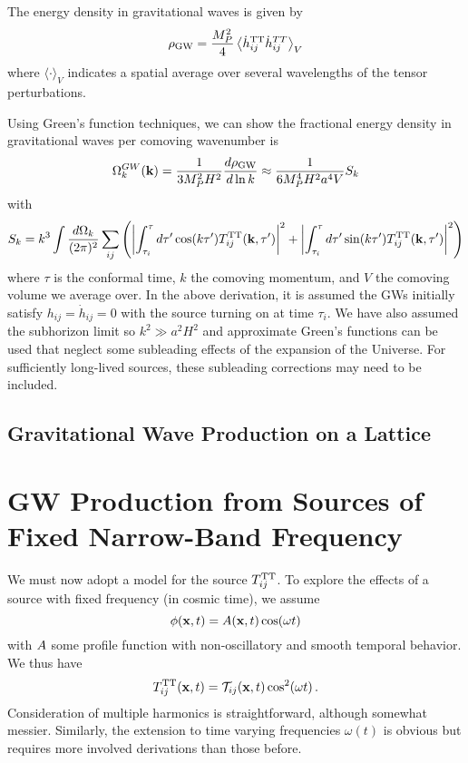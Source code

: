 \documentclass{revtex4}
\begin{document}
The energy density in gravitational waves is given by
\begin{equation}
  \rho_{\rm GW} = \frac{M_P^2}{4}\left\langle\dot{h}_{ij}^{\rm TT}\dot{h}_{ij}^{TT}\right\rangle_V
\end{equation}
where $\langle\cdot\rangle_V$ indicates a spatial average over several wavelengths of the tensor perturbations.

Using Green's function techniques, we can show the fractional energy density in gravitational waves per comoving wavenumber is
\begin{equation}
  \Omega_k^{GW}({\bf k}) = \frac{1}{3M_P^2H^2}\frac{d\rho_{\rm GW}}{d\ln k} \approx \frac{1}{6M_P^4H^2a^4V}S_k
\end{equation}
with
\begin{equation}
  S_k = k^3\int \frac{d\Omega_k}{(2\pi)^2}\sum_{ij}\left(\left|\int_{\tau_i}^\tau d\tau'\cos(k\tau')T_{ij}^{{\rm TT}}({\bf k},\tau')\right|^2 + \left|\int_{\tau_i}^\tau d\tau'\sin(k\tau')T_{ij}^{{\rm TT}}({\bf k},\tau')\right|^2 \right)
\end{equation}
where $\tau$ is the conformal time, $k$ the comoving momentum, and $V$ the comoving volume we average over.
In the above derivation, it is assumed the GWs initially satisfy $h_{ij}=\dot{h}_{ij}=0$ with the source turning on at time $\tau_i$.
We have also assumed the subhorizon limit so $k^2 \gg a^2H^2$ and approximate Green's functions can be used that neglect some subleading effects of the expansion of the Universe.
For sufficiently long-lived sources, these subleading corrections may need to be included.

\subsection{Gravitational Wave Production on a Lattice}

\section{GW Production from Sources of Fixed Narrow-Band Frequency}\label{sec:gw-narrow-band}
We must now adopt a model for the source $T_{ij}^{{\rm TT}}$.
To explore the effects of a source with fixed frequency (in cosmic time), we assume
\begin{equation}
  \phi({\bf x},t) = A({\bf x},t)\cos(\omega t)
\end{equation}
with $A$ some profile function with non-oscillatory and smooth temporal behavior.
We thus have
\begin{equation}
  T_{ij}^{{\rm TT}}({\bf x},t) = \mathcal{T}_{ij}({\bf x},t)\cos^2(\omega t) \, .
\end{equation}
Consideration of multiple harmonics is straightforward, although somewhat messier.
Similarly, the extension to time varying frequencies $\omega(t)$ is obvious but requires more involved derivations than those before.
\end{document}

